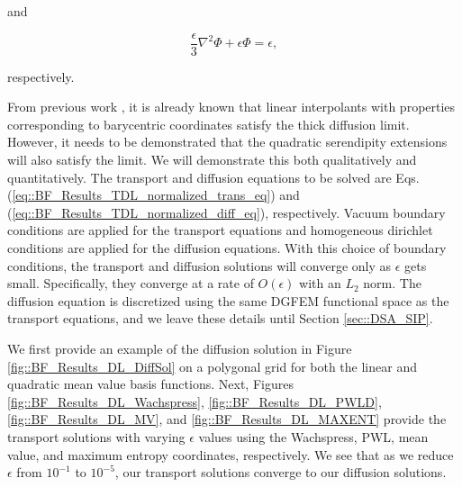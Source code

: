 \noindent and

\begin{equation}
\label{eq::BF_Results_TDL_normalized_diff_eq}
\frac{\epsilon}{3} {\nabla}^2 \Phi + \epsilon  \Phi =  \epsilon ,
\end{equation}

\noindent respectively.

From previous work \cite{adams2001dfem}, it is already known that linear interpolants with properties corresponding to barycentric coordinates satisfy the thick diffusion limit. However, it needs to be demonstrated that the quadratic serendipity extensions will also satisfy the limit. We will demonstrate this both qualitatively and quantitatively. The transport and diffusion equations to be solved are Eqs. (\ref{eq::BF_Results_TDL_normalized_trans_eq}) and (\ref{eq::BF_Results_TDL_normalized_diff_eq}), respectively. Vacuum boundary conditions are applied for the transport equations and homogeneous dirichlet conditions are applied for the diffusion equations. With this choice of boundary conditions, the transport and diffusion solutions will converge only as $\epsilon$ gets small. Specifically, they converge at a rate of $O(\epsilon)$ with an $L_2$ norm. The diffusion equation is discretized using the same DGFEM functional space as the transport equations, and we leave these details until Section \ref{sec::DSA_SIP}. 

We first provide an example of the diffusion solution in Figure \ref{fig::BF_Results_DL_DiffSol} on a polygonal grid for both the linear and quadratic mean value basis functions. Next, Figures \ref{fig::BF_Results_DL_Wachspress}, \ref{fig::BF_Results_DL_PWLD}, \ref{fig::BF_Results_DL_MV}, and \ref{fig::BF_Results_DL_MAXENT} provide the transport solutions with varying $\epsilon$ values using the Wachspress, PWL, mean value, and maximum entropy coordinates, respectively. We see that as we reduce $\epsilon$ from $10^{-1}$ to $10^{-5}$, our transport solutions converge to our diffusion solutions.

